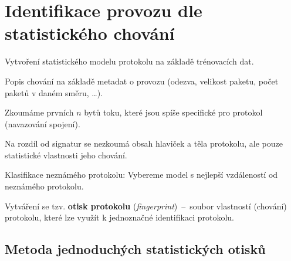 
\section{Identifikace provozu dle statistického chování}

\begin{compactitem}
    \item Vytvoření statistického modelu protokolu na základě trénovacích dat. \begin{compactitem}
        \item Popis chování na základě metadat o provozu (odezva, velikost paketu, počet paketů v daném směru, \dots).
        \item Zkoumáme prvních $n$ bytů toku, které jsou spíše specifické pro protokol (navazování spojení).
        \item Na rozdíl od signatur se nezkoumá obsah hlaviček a těla protokolu, ale pouze statistické vlastnosti jeho chování.
    \end{compactitem}
    \item
    \item Klasifikace neznámého protokolu: Vybereme model s nejlepší vzdáleností od neznámého protokolu.
    \item Vytváření se tzv. \textbf{otisk protokolu} (\textit{fingerprint})~--~soubor vlastností (chování) protokolu, které lze využít k jednoznačné identifikaci protokolu.
\end{compactitem}

\subsection*{Metoda jednoduchých statistických otisků}

